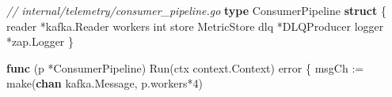 \documentclass[
]{article}
\newenvironment{Shaded}{}{}
\newcommand{\BuiltInTok}[1]{\textcolor[rgb]{0.00,0.50,0.00}{#1}}
\newcommand{\CommentTok}[1]{\textcolor[rgb]{0.38,0.63,0.69}{\textit{#1}}}
\newcommand{\DataTypeTok}[1]{\textcolor[rgb]{0.56,0.13,0.00}{#1}}
\newcommand{\DecValTok}[1]{\textcolor[rgb]{0.25,0.63,0.44}{#1}}
\newcommand{\KeywordTok}[1]{\textcolor[rgb]{0.00,0.44,0.13}{\textbf{#1}}}
\newcommand{\NormalTok}[1]{#1}
\newcommand{\OperatorTok}[1]{\textcolor[rgb]{0.40,0.40,0.40}{#1}}
\begin{document}
\begin{Shaded}
\begin{Highlighting}[]
\CommentTok{// internal/telemetry/consumer\_pipeline.go}
\KeywordTok{type}\NormalTok{ ConsumerPipeline }\KeywordTok{struct} \OperatorTok{\{}
\NormalTok{    reader    }\OperatorTok{*}\NormalTok{kafka}\OperatorTok{.}\NormalTok{Reader}
\NormalTok{    workers   }\DataTypeTok{int}
\NormalTok{    store     MetricStore}
\NormalTok{    dlq       }\OperatorTok{*}\NormalTok{DLQProducer}
\NormalTok{    logger    }\OperatorTok{*}\NormalTok{zap}\OperatorTok{.}\NormalTok{Logger}
\OperatorTok{\}}

\KeywordTok{func} \OperatorTok{(}\NormalTok{p }\OperatorTok{*}\NormalTok{ConsumerPipeline}\OperatorTok{)}\NormalTok{ Run}\OperatorTok{(}\NormalTok{ctx context}\OperatorTok{.}\NormalTok{Context}\OperatorTok{)} \DataTypeTok{error} \OperatorTok{\{}
\NormalTok{    msgCh }\OperatorTok{:=} \BuiltInTok{make}\OperatorTok{(}\KeywordTok{chan}\NormalTok{ kafka}\OperatorTok{.}\NormalTok{Message}\OperatorTok{,}\NormalTok{ p}\OperatorTok{.}\NormalTok{workers}\OperatorTok{*}\DecValTok{4}\OperatorTok{)}


\end{Highlighting}
\end{Shaded}
\end{document}
